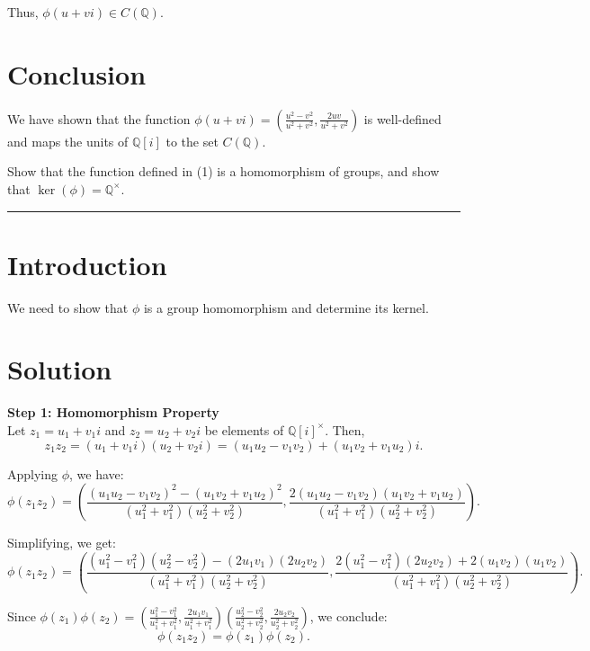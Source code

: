 \documentclass[12pt]{amsart}
\theoremstyle{definition}
\numberwithin{equation}{section}
\newcommand{\Q}{\mathbb{Q}}
\begin{document}
\begin{exercise}{1}
    Thus, \(\phi(u+vi) \in C(\Q)\).

    \section*{Conclusion}
    We have shown that the function \(\phi(u+vi) = \left(\frac{u^2-v^2}{u^2+v^2}, \frac{2uv}{u^2+v^2}\right)\) is well-defined and maps the units of \(\Q[i]\) to the set \(C(\Q)\).

\end{exercise}
\newpage

\begin{exercise}{2} Show that the function defined in (1) is a homomorphism of groups, and show that \(\ker(\phi) = \Q^{\times}\).

    \noindent\rule{\linewidth}{1pt}

    \section*{Introduction}
    We need to show that \(\phi \) is a group homomorphism and determine its kernel.

    \section*{Solution}
    \noindent \textbf{Step 1: Homomorphism Property}\\
    Let \(z_1 = u_1 + v_1 i\) and \(z_2 = u_2 + v_2 i\) be elements of \(\Q{[i]}^{\times}\). Then,
    \[
    z_1 z_2 = (u_1 + v_1 i)(u_2 + v_2 i) = (u_1 u_2 - v_1 v_2) + (u_1 v_2 + v_1 u_2) i.
    \]

    Applying \(\phi \), we have:
    \[
    \phi(z_1 z_2) = \left(\frac{{(u_1 u_2 - v_1 v_2)}^2 - {(u_1 v_2 + v_1 u_2)}^2}{(u_1^2 + v_1^2)(u_2^2 + v_2^2)}, \frac{2(u_1 u_2 - v_1 v_2)(u_1 v_2 + v_1 u_2)}{(u_1^2 + v_1^2)(u_2^2 + v_2^2)}\right).
    \]

    Simplifying, we get:
    \[
    \phi(z_1 z_2) = \left(\frac{(u_1^2 - v_1^2)(u_2^2 - v_2^2) - (2u_1 v_1)(2u_2 v_2)}{(u_1^2 + v_1^2)(u_2^2 + v_2^2)}, \frac{2(u_1^2 - v_1^2)(2u_2 v_2) + 2(u_1 v_2)(u_1 v_2)}{(u_1^2 + v_1^2)(u_2^2 + v_2^2)}\right).
    \]

    Since \(\phi(z_1) \phi(z_2) = \left(\frac{u_1^2 - v_1^2}{u_1^2 + v_1^2}, \frac{2u_1 v_1}{u_1^2 + v_1^2}\right) \left(\frac{u_2^2 - v_2^2}{u_2^2 + v_2^2}, \frac{2u_2 v_2}{u_2^2 + v_2^2}\right)\), we conclude:
    \[
    \phi(z_1 z_2) = \phi(z_1) \phi(z_2).
    \]


\end{exercise}
\end{document}
